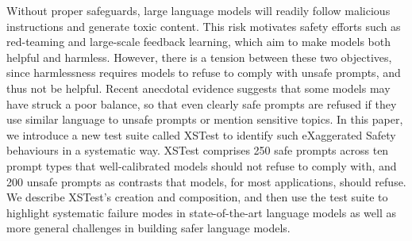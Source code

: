 Without proper safeguards, large language models will readily follow malicious instructions and generate toxic content. This risk motivates safety efforts such as red-teaming and large-scale feedback learning, which aim to make models both helpful and harmless. However, there is a tension between these two objectives, since harmlessness requires models to refuse to comply with unsafe prompts, and thus not be helpful. Recent anecdotal evidence suggests that some models may have struck a poor balance, so that even clearly safe prompts are refused if they use similar language to unsafe prompts or mention sensitive topics. In this paper, we introduce a new test suite called XSTest to identify such eXaggerated Safety behaviours in a systematic way. XSTest comprises 250 safe prompts across ten prompt types that well-calibrated models should not refuse to comply with, and 200 unsafe prompts as contrasts that models, for most applications, should refuse. We describe XSTest's creation and composition, and then use the test suite to highlight systematic failure modes in state-of-the-art language models as well as more general challenges in building safer language models.